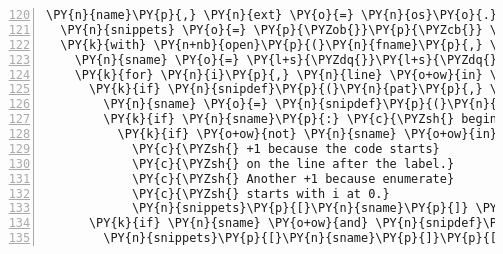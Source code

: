 \begin{Verbatim}[commandchars=\\\{\},numbers=left,numbersep=0.5em,firstnumber=120]
  \PY{n}{name}\PY{p}{,} \PY{n}{ext} \PY{o}{=} \PY{n}{os}\PY{o}{.}\PY{n}{path}\PY{o}{.}\PY{n}{splitext}\PY{p}{(}\PY{n}{fname}\PY{p}{)}
  \PY{n}{snippets} \PY{o}{=} \PY{p}{\PYZob{}}\PY{p}{\PYZcb{}} \PY{c}{\PYZsh{} dict of this file\PYZsq{}s snippets}
  \PY{k}{with} \PY{n+nb}{open}\PY{p}{(}\PY{n}{fname}\PY{p}{,} \PY{l+s}{\PYZdq{}}\PY{l+s}{r}\PY{l+s}{\PYZdq{}}\PY{p}{)} \PY{k}{as} \PY{n}{fin}\PY{p}{:}
    \PY{n}{sname} \PY{o}{=} \PY{l+s}{\PYZdq{}}\PY{l+s}{\PYZdq{}} \PY{c}{\PYZsh{} sname will be the name of snippet}
    \PY{k}{for} \PY{n}{i}\PY{p}{,} \PY{n}{line} \PY{o+ow}{in} \PY{n+nb}{enumerate}\PY{p}{(}\PY{n}{fin}\PY{o}{.}\PY{n}{readlines}\PY{p}{(}\PY{p}{)}\PY{p}{)}\PY{p}{:}
      \PY{k}{if} \PY{n}{snipdef}\PY{p}{(}\PY{n}{pat}\PY{p}{,} \PY{n}{line}\PY{p}{)} \PY{o+ow}{is} \PY{o+ow}{not} \PY{n+nb+bp}{None}\PY{p}{:}
        \PY{n}{sname} \PY{o}{=} \PY{n}{snipdef}\PY{p}{(}\PY{n}{pat}\PY{p}{,} \PY{n}{line}\PY{p}{)}     
        \PY{k}{if} \PY{n}{sname}\PY{p}{:} \PY{c}{\PYZsh{} beginning of a snippet}
          \PY{k}{if} \PY{o+ow}{not} \PY{n}{sname} \PY{o+ow}{in} \PY{n}{snippets}\PY{p}{:}
            \PY{c}{\PYZsh{} +1 because the code starts}
            \PY{c}{\PYZsh{} on the line after the label.}
            \PY{c}{\PYZsh{} Another +1 because enumerate}
            \PY{c}{\PYZsh{} starts with i at 0.}
            \PY{n}{snippets}\PY{p}{[}\PY{n}{sname}\PY{p}{]} \PY{o}{=} \PY{p}{(}\PY{n}{i}\PY{o}{+}\PY{l+m+mi}{2}\PY{p}{,} \PY{p}{[}\PY{p}{]}\PY{p}{)}
      \PY{k}{if} \PY{n}{sname} \PY{o+ow}{and} \PY{n}{snipdef}\PY{p}{(}\PY{n}{pat}\PY{p}{,} \PY{n}{line}\PY{p}{)} \PY{o+ow}{is} \PY{n+nb+bp}{None}\PY{p}{:}
        \PY{n}{snippets}\PY{p}{[}\PY{n}{sname}\PY{p}{]}\PY{p}{[}\PY{l+m+mi}{1}\PY{p}{]}\PY{o}{.}\PY{n}{append}\PY{p}{(}\PY{n}{line}\PY{p}{)}
\end{Verbatim}
